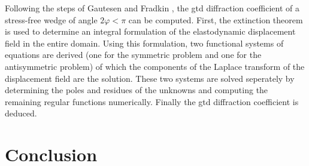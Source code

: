 Following the steps of Gautesen and Fradkin \cite{GautesenFradkin}, the \acrshort{gtd} diffraction coefficient of a stress-free wedge of angle $2\varphi<\pi$ can be computed. First, the extinction theorem is used to determine an integral formulation of the elastodynamic displacement field in the entire domain. Using this formulation, two functional systems of equations are derived (one for the symmetric problem and one for the antisymmetric problem) of which the components of the Laplace transform of the displacement field are the solution. These two systems are solved seperately by determining the poles and residues of the unknowns and computing the remaining regular functions numerically. Finally the \acrshort{gtd} diffraction coefficient is deduced.

\section*{Conclusion}